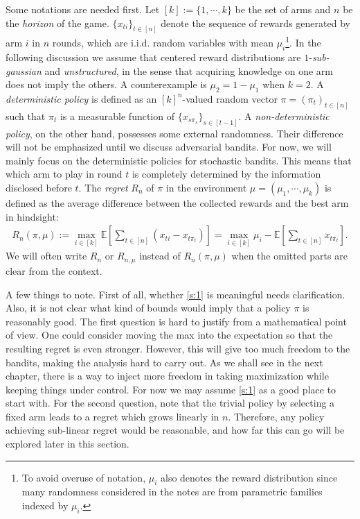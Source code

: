 \documentclass[letterpaper,11pt,openright,openany]{book}
\numberwithin{equation}{section}
\theoremstyle{plain}
\theoremstyle{definition}
\def\E{{\mathbb E}}
\begin{document}
Some notations are needed first. 
Let $[k]:=\{1, \cdots, k\}$ be the set of arms and $n$ be the \emph{horizon} of the game. 
$\{x_{ti}\}_{t\in [n]}$ denote the sequence of rewards generated by arm $i$ in $n$ rounds, which are i.i.d. random variables with mean $\mu_i$\footnote{To avoid overuse of notation, $\mu_i$ also denotes the reward distribution since many randomness considered in the notes are from parametric families indexed by $\mu_i$. }. 
In the following discussion we assume that centered reward distributions are $1$-\emph{sub-gaussian} and \emph{unstructured}, in the sense that acquiring knowledge on one arm does not imply the others. 
A counterexample is $\mu_2=1-\mu_1$ when $k= 2$. A \emph{deterministic policy} is defined as an $[k]^n$-valued random vector $\pi = (\pi_t)_{t\in [n]}$ such that $\pi_t$ is a measurable function of $\{x_{s\pi_{s}}\}_{s\in [t-1]}$. A \emph{non-deterministic policy}, on the other hand, possesses some external randomness. Their difference will not be emphasized until we discuss adversarial bandits. For now, we will mainly focus on the deterministic policies for stochastic bandits. This means that which arm to play in round $t$ is completely determined by the information disclosed before $t$. The \emph{regret} $R_n$ of $\pi$ in the environment $\mu=(\mu_1, \cdots, \mu_k)$ is defined as the average difference between the collected rewards and the best arm in hindsight:
\begin{align}
R_n(\pi, \mu):=\max_{i\in [k]}\E\left[\sum_{t\in [n]}(x_{ti}-x_{t\pi_t})\right]=\max_{i\in [k]}\mu_i -\E\left[\sum_{t\in [n]}x_{t\pi_t}\right]. \label{s:1}
\end{align}
We will often write $R_n$ or $R_{n,\mu}$ instead of $R_n(\pi, \mu)$ when the omitted parts are clear from the context. 

A few things to note. 
First of all, whether \eqref{s:1} is meaningful needs clarification. 
Also, it is not clear what kind of bounds would imply that a policy $\pi$ is reasonably good. 
The first question is hard to justify from a mathematical point of view. 
One could consider moving the max into the expectation so that the resulting regret is even stronger. 
However, this will give too much freedom to the bandits, making the analysis hard to carry out. 
As we shall see in the next chapter, there is a way to inject more freedom in taking maximization while keeping things under control. 
For now we may assume \eqref{s:1} as a good place to start with.  
For the second question, note that the trivial policy by selecting a fixed arm leads to a regret which grows linearly in $n$.  Therefore, any policy achieving sub-linear regret would be reasonable, and how far this can go will be explored later in this section.
\end{document}
